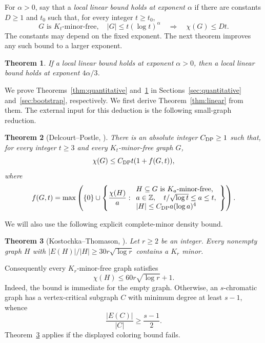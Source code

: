 \documentclass[11pt]{article}
\newtheorem{theorem}{Theorem}
\begin{document}
For $\alpha>0$, say that a \emph{local linear bound holds at exponent
$\alpha$} if there are constants $D\ge1$ and $t_0$ such that, for every
integer $t\ge t_0$,
\[
 G\text{ is }K_t\text{-minor-free},\quad |G|\le t(\log t)^\alpha
 \quad\Longrightarrow\quad \chi(G)\le Dt.
\]
The constants may depend on the fixed exponent. The next theorem
improves any such bound to a larger exponent.

\begin{theorem}\label{thm:bootstrap}
If a local linear bound holds at exponent $\alpha>0$, then a local
linear bound holds at exponent $4\alpha/3$.
\end{theorem}

We prove Theorems~\ref{thm:quantitative} and~\ref{thm:bootstrap} in
Sections~\ref{sec:quantitative} and~\ref{sec:bootstrap}, respectively.
We first derive Theorem~\ref{thm:linear} from them. The external input
for this deduction is the following small-graph reduction.

\begin{theorem}[Delcourt--Postle, {\cite[Theorem~1.6]{DP}}]\label{thm:dp}
There is an absolute integer $C_{\rm DP}\ge1$ such that, for every integer
$t\ge3$ and every $K_t$-minor-free graph $G$,
\[
 \chi(G)\le C_{\rm DP}t(1+f(G,t)),
\]
where
\[
 f(G,t)=\max\left(\{0\}\cup\left\{\frac{\chi(H)}a:
 \begin{array}{l}
 H\subseteq G\text{ is }K_a\text{-minor-free},\\
 a\in\mathbb Z,\quad t/\sqrt{\log t}\le a\le t,\\
 |H|\le C_{\rm DP}a(\log a)^4
 \end{array}\right\}\right).
\]
\end{theorem}

We will also use the following explicit complete-minor density bound.
\begin{theorem}[Kostochka--Thomason, {\cite[Theorem~4.3]{DP}}]
\label{thm:density}
Let $r\ge2$ be an integer. Every nonempty graph $H$ with
$|E(H)|/|H|\ge30r\sqrt{\log r}$ contains a $K_r$ minor.
\end{theorem}
Consequently every $K_r$-minor-free graph satisfies
\begin{equation}\label{eq:ktcolor}
 \chi(H)\le60r\sqrt{\log r}+1.
\end{equation}
Indeed, the bound is immediate for the empty graph. Otherwise, an
$s$-chromatic graph has a vertex-critical subgraph $C$ with
minimum degree at least $s-1$, whence
\[
 \frac{|E(C)|}{|C|}\ge\frac{s-1}{2}.
\]
Theorem~\ref{thm:density} applies if the displayed coloring bound fails.
\end{document}

